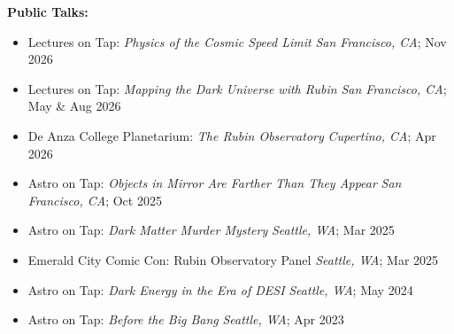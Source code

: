\textbf{Public Talks:}
\begin{itemize}
    \item Lectures on Tap: \textit{Physics of the Cosmic Speed Limit} \hfill \textit{San Francisco, CA}; Nov 2026

    \item Lectures on Tap: \textit{Mapping the Dark Universe with Rubin} \hfill \textit{San Francisco, CA}; May \& Aug 2026

    \item De Anza College Planetarium: \textit{The Rubin Observatory} \hfill \textit{Cupertino, CA}; Apr 2026

    \item Astro on Tap: \textit{Objects in Mirror Are Farther Than They Appear} \hfill \textit{San Francisco, CA}; Oct 2025

    \item Astro on Tap: \textit{Dark Matter Murder Mystery} \hfill \textit{Seattle, WA}; Mar 2025

    \item Emerald City Comic Con: Rubin Observatory Panel \hfill \textit{Seattle, WA}; Mar 2025

    \item Astro on Tap: \textit{Dark Energy in the Era of DESI} \hfill \textit{Seattle, WA}; May 2024

    \item Astro on Tap: \textit{Before the Big Bang} \hfill \textit{Seattle, WA}; Apr 2023


\end{itemize}

